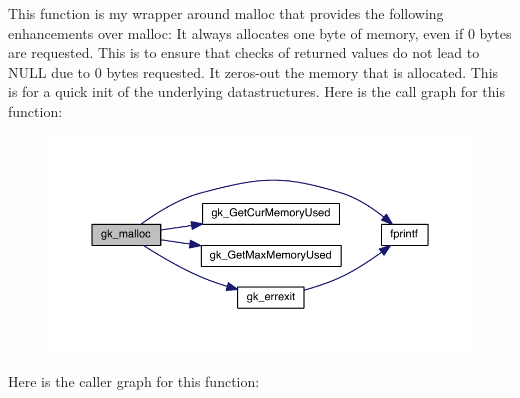 This function is my wrapper around malloc that provides the following enhancements over malloc\+: It always allocates one byte of memory, even if 0 bytes are requested. This is to ensure that checks of returned values do not lead to N\+U\+LL due to 0 bytes requested. It zeros-\/out the memory that is allocated. This is for a quick init of the underlying datastructures. Here is the call graph for this function\+:\nopagebreak
\begin{figure}[H]
\begin{center}
\leavevmode
\includegraphics[width=350pt]{a00110_aba6f76f5c67b9b7e9c2e45988d3d3e9d_cgraph}
\end{center}
\end{figure}
Here is the caller graph for this function\+:\nopagebreak
